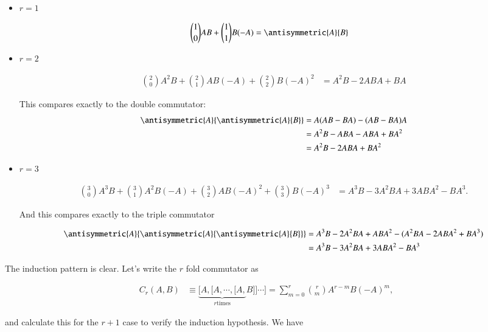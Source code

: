 \begin{itemize}
\item $r=1$

\begin{align*}
\binom{1}{0} A B + \binom{1}{1} B (-A) &= \antisymmetric{A}{B}
\end{align*}

\item $r=2$

\begin{align*}
\binom{2}{0} A^2 B + \binom{2}{1} A B (-A) + \binom{2}{2} B (-A)^2 &= A^2 B - 2 A B A + B A
\end{align*}

This compares exactly to the double commutator:
\begin{align*}
\antisymmetric{A}{\antisymmetric{A}{B}}
&= 
A(A B - B A) -(A B - B A)A \\
&= 
A^2 B - A B A - A B A + B A^2 \\
&= 
A^2 B - 2 A B A + B A^2 \\
\end{align*}

\item $r=3$

\begin{align*}
\binom{3}{0} A^3 B + \binom{3}{1} A^2 B (-A) + \binom{3}{2} A B (-A)^2 + \binom{3}{3} B (-A)^3 
&= 
A^3 B - 3 A^2 B A + 3 A B A^2 - B A^3.
\end{align*}

And this compares exactly to the triple commutator

\begin{align*}
\antisymmetric{A}{\antisymmetric{A}{\antisymmetric{A}{B}}}
&=
A^3 B - 2 A^2 B A + A B A^2 -(A^2 B A - 2 A B A^2 + B A^3) \\
&=
A^3 B - 3 A^2 B A + 3 A B A^2 -B A^3 \\
\end{align*}
\end{itemize}

The induction pattern is clear.  Let's write the $r$ fold commutator as

\begin{align}\label{eqn:exponentialSandwichCommutator:2}
C_r(A,B) &\equiv 
\underbrace{[A, [A, \cdots, [A,}_{r \text{times}} B]] \cdots ] 
= \sum_{m=0}^r \binom{r}{m} A^{r-m} B (-A)^m,
\end{align}

and calculate this for the $r+1$ case to verify the induction hypothesis.  We have

